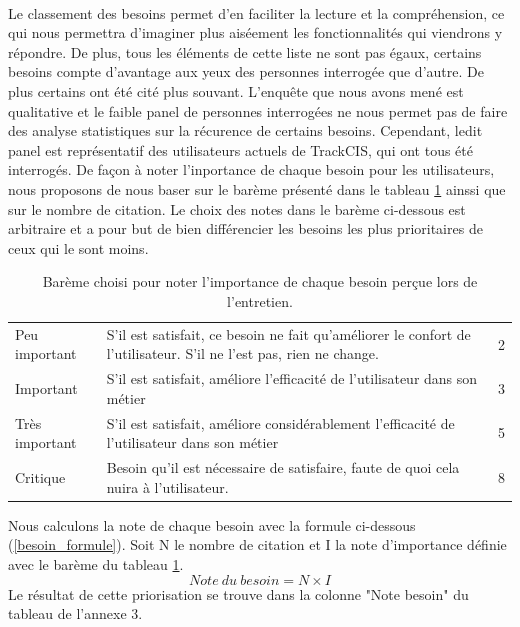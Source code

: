 			\paragraph{}%
			Le classement des besoins permet d'en faciliter la lecture et la
			compréhension, ce qui nous permettra d'imaginer plus aiséement les
			fonctionnalités qui viendrons y répondre. De plus, tous les éléments de cette
			liste ne sont pas égaux, certains besoins compte d'avantage aux yeux des
			personnes interrogée que d'autre. De plus certains ont été cité plus souvant.
			L'enquête que nous avons mené est qualitative et le faible panel de personnes
			interrogées ne nous permet pas de faire des analyse statistiques sur la
			récurence de certains besoins. Cependant, ledit panel est représentatif des
			utilisateurs actuels de TrackCIS, qui ont tous été interrogés. De façon à
			noter l'inportance de chaque besoin pour les utilisateurs, nous proposons de
			nous baser sur le barème présenté dans le tableau \ref{bareme_besoins}
			ainssi que sur le nombre de citation. Le choix des notes dans le barème
			ci-dessous est arbitraire et a pour but de bien différencier les besoins les
			plus prioritaires de ceux qui le sont moins.
			\begin{table}[H]
				\centering
				\begin{tabular}{| p{4cm} | p{8cm} | p{2cm} |}
					\hline
						\thead{Priorité}
						&\thead{Description}
						&\thead{Note}
						\\
					\hline
						Peu important
						&
						S'il est satisfait, ce besoin ne fait qu'améliorer le confort de l'utilisateur. S'il ne l'est pas, rien ne change.
						&
						2
						\\
					\hline
						Important
						&
						S'il est satisfait, améliore l'efficacité de l'utilisateur dans son métier
						&
						3
						\\
					\hline
						Très important
						&
						S'il est satisfait, améliore considérablement l'efficacité de l'utilisateur dans son métier
						&
						5
						\\
					\hline
						Critique
						&
						Besoin qu'il est nécessaire de satisfaire, faute de quoi cela nuira à l'utilisateur.
						&
						8
						\\
					\hline
				\end{tabular}
				\caption{\label{bareme_besoins} Barème choisi pour noter l'importance de
				chaque besoin perçue lors de l'entretien.}
			\end{table}
			Nous calculons la note de chaque besoin avec la formule ci-dessous
			(\ref{besoin_formule}).
			Soit N le nombre de citation et I la note d'importance définie avec le barème du
			tableau \ref{bareme_besoins}.
			\begin{equation}
				\label{besoin_formule}
				Note\ du\ besoin=N\times I
			\end{equation}
			Le résultat de cette priorisation se trouve dans la colonne "Note besoin" du
			tableau de l'annexe 3.
	
